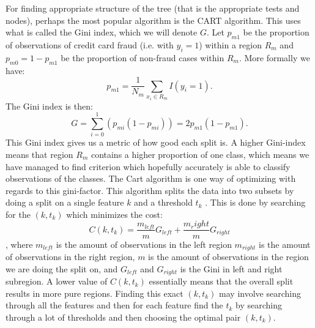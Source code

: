 \documentclass{article}
\begin{document}
For finding appropriate structure of the tree (that is the appropriate tests
and nodes), perhaps the most popular algorithm is the CART algorithm. This uses
what is called the Gini index, which we will denote $G$. Let $p_{m 1}$ be the
proportion of observations of credit card fraud (i.e. with $y_i = 1$) within a
region $R_m$ and $p_{m 0} = 1 - p_{m 1}$ be the proportion of non-fraud cases
within $R_m$. More formally we have:
$$p_{m 1} = \frac{1}{N_m} \sum_{x_i \in R_m} I(y_i = 1).$$
The Gini index is then:
$$G = \sum_{i=0}^{1} (p_{m i} (1 - p_{m i})) = 2 p_{m 1} (1 - p_{m 1}).$$
This Gini index gives us a metric of how good each split is. A higher
Gini-index means that region $R_m$ contains a higher proportion of one class,
which means we have managed to find criterion which hopefully accurately is
able to classify observations of the classes. The Cart algorithm is one way of
optimizing with regards to this gini-factor. This algorithm splits the data
into two subsets by doing a split on a single feature $k$ and a threshold $t_k$
\cite[s.~The CART algorithm for Classification]{lecturesweek46}. This is done
by searching for the $(k, t_{k})$ which minimizes the cost:
$$C(k, t_k) = \frac{m_{left}}{m} G_{left} + \frac{m_right}{m} G_{right}$$
, where $m_{left}$ is the amount of observations in the left region $m_{right}$
is the amount of observations in the right region, $m$ is the amount of
observations in the region we are doing the split on, and $G_{left}$ and
$G_{right}$ is the Gini in left and right subregion. A lower value of $C(k,
	t_k)$ essentially means that the overall split results in more pure regions.
Finding this exact $(k, t_k)$ may involve searching through all the features
and then for each feature find the $t_k$ by searching through a lot of
thresholds and then choosing the optimal pair $(k, t_k)$.
\end{document}

